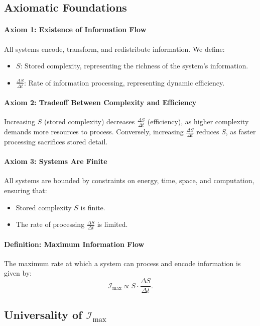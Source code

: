 \documentclass[12pt]{article}
\begin{document}
\subsection{Axiomatic Foundations}

\paragraph{Axiom 1: Existence of Information Flow}
All systems encode, transform, and redistribute information. We define:
\begin{itemize}
    \item \(S\): Stored complexity, representing the richness of the system's information.
    \item \(\frac{\Delta S}{\Delta t}\): Rate of information processing, representing dynamic efficiency.
\end{itemize}

\paragraph{Axiom 2: Tradeoff Between Complexity and Efficiency}
Increasing \(S\) (stored complexity) decreases \(\frac{\Delta S}{\Delta t}\) (efficiency), as higher complexity demands more resources to process. Conversely, increasing \(\frac{\Delta S}{\Delta t}\) reduces \(S\), as faster processing sacrifices stored detail.

\paragraph{Axiom 3: Systems Are Finite}
All systems are bounded by constraints on energy, time, space, and computation, ensuring that:
\begin{itemize}
    \item Stored complexity \(S\) is finite.
    \item The rate of processing \(\frac{\Delta S}{\Delta t}\) is limited.
\end{itemize}

\paragraph{Definition: Maximum Information Flow}
The maximum rate at which a system can process and encode information is given by:
\[
\mathcal{I}_{\text{max}} \propto S \cdot \frac{\Delta S}{\Delta t}.
\]

\subsection{Universality of \(\mathcal{I}_{\text{max}}\)}
\end{document}
